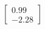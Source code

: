 \documentclass[preview]{standalone}
\begin{document}
\begin{align*}
\begin{bmatrix} 0.99 \\ -2.28 \end{bmatrix}
\end{align*}
\end{document}
